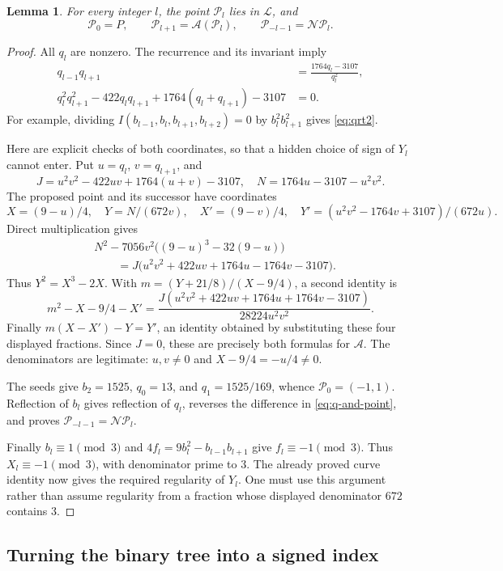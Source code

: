 \documentclass[11pt,a4paper]{article}
\newtheorem{lemma}[theorem]{Lemma}
\theoremstyle{definition}
\newcommand{\pp}{\mathcal P}
\newcommand{\NN}{\mathcal N}
\renewcommand{\AA}{\mathcal A}
\begin{document}
\begin{lemma}\label{lem:actualpoint}
For every integer \(l\), the point \(\pp_l\) lies in
\(\mathcal L\), and
\[
 \pp_0=P,\qquad \pp_{l+1}=\AA(\pp_l),\qquad
 \pp_{-l-1}=\NN\pp_l.
\]
\end{lemma}
\begin{proof}
All \(q_l\) are nonzero. The recurrence and its invariant imply
\begin{align}
 q_{l-1}q_{l+1}&=\frac{1764q_l-3107}{q_l^2},\label{eq:qrt1}\\
 q_l^2q_{l+1}^2-422q_lq_{l+1}
       +1764(q_l+q_{l+1})-3107&=0.\label{eq:qrt2}
\end{align}
For example, dividing \(I(b_{l-1},b_l,b_{l+1},b_{l+2})=0\)
by \(b_l^2b_{l+1}^2\) gives \eqref{eq:qrt2}.

Here are explicit checks of both coordinates, so that a hidden
choice of sign of \(Y_l\) cannot enter. Put \(u=q_l\),
\(v=q_{l+1}\), and
\[
 J=u^2v^2-422uv+1764(u+v)-3107,\quad
 N=1764u-3107-u^2v^2.
\]
The proposed point and its successor have coordinates
\[
 X=(9-u)/4,\quad Y=N/(672v),\quad
 X'=(9-v)/4,\quad
 Y'=(u^2v^2-1764v+3107)/(672u).
\]
Direct multiplication gives
\begin{align*}
 &N^2-7056v^2\bigl((9-u)^3-32(9-u)\bigr)\\
 &\qquad=J\bigl(u^2v^2+422uv+1764u-1764v-3107\bigr).
\end{align*}
Thus \(Y^2=X^3-2X\). With
\(m=(Y+21/8)/(X-9/4)\), a second identity is
\[
 m^2-X-9/4-X'
 =\frac{J(u^2v^2+422uv+1764u+1764v-3107)}{28224u^2v^2}.
\]
Finally \(m(X-X')-Y=Y'\), an identity obtained by substituting
these four displayed fractions. Since \(J=0\), these are precisely
both formulas for \(\AA\). The denominators are legitimate:
\(u,v\ne0\) and \(X-9/4=-u/4\ne0\).

The seeds give \(b_2=1525\), \(q_0=13\), and
\(q_1=1525/169\), whence \(\pp_0=(-1,1)\).
Reflection of \(b_l\) gives reflection of \(q_l\), reverses the
difference in \eqref{eq:q-and-point}, and proves
\(\pp_{-l-1}=\NN\pp_l\).

Finally \(b_l\equiv1\pmod3\) and
\(4f_l=9b_l^2-b_{l-1}b_{l+1}\) give \(f_l\equiv-1\pmod3\).
Thus \(X_l\equiv-1\pmod3\), with denominator prime to \(3\).
The already proved curve identity now gives the required regularity
of \(Y_l\). One must use this argument rather than assume regularity
from a fraction whose displayed denominator \(672\) contains \(3\).
\end{proof}

\subsection{Turning the binary tree into a signed index}
\end{document}
